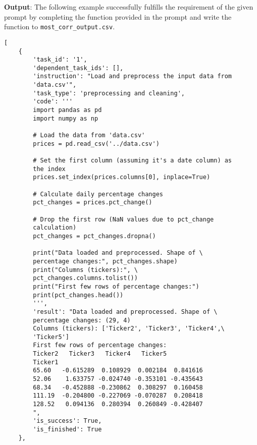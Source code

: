 \begin{tcolorbox}[colback=blue!5!white, colframe=blue!75!black, title=Successful case \#2 from Claude-3-5-sonnet-20240620, text width=\textwidth]
\textbf{Output}: The following example successfully fulfills the requirement of the given prompt by completing the function provided in the prompt and write the function to \texttt{most\_corr\_output.csv}.
\begin{verbatim}
[
    {
        'task_id': '1',
        'dependent_task_ids': [],
        'instruction': "Load and preprocess the input data from 
        'data.csv'",
        'task_type': 'preprocessing and cleaning',
        'code': '''
        import pandas as pd
        import numpy as np

        # Load the data from 'data.csv'
        prices = pd.read_csv('../data.csv')

        # Set the first column (assuming it's a date column) as
        the index
        prices.set_index(prices.columns[0], inplace=True)

        # Calculate daily percentage changes
        pct_changes = prices.pct_change()

        # Drop the first row (NaN values due to pct_change 
        calculation)
        pct_changes = pct_changes.dropna()

        print("Data loaded and preprocessed. Shape of \
        percentage changes:", pct_changes.shape)
        print("Columns (tickers):", \
        pct_changes.columns.tolist())
        print("First few rows of percentage changes:")
        print(pct_changes.head())
        ''',
        'result': "Data loaded and preprocessed. Shape of \
        percentage changes: (29, 4)
        Columns (tickers): ['Ticker2', 'Ticker3', 'Ticker4',\
        'Ticker5']
        First few rows of percentage changes:
        Ticker2   Ticker3   Ticker4   Ticker5
        Ticker1                                        
        65.60   -0.615289  0.108929  0.002184  0.841616
        52.06    1.633757 -0.024740 -0.353101 -0.435643
        68.34   -0.452888 -0.230862  0.308297  0.160458
        111.19  -0.204800 -0.227069 -0.070287  0.208418
        128.52   0.094136  0.280394  0.260849 -0.428407
        ",
        'is_success': True,
        'is_finished': True
    },
\end{verbatim}
\end{tcolorbox}
\twocolumn